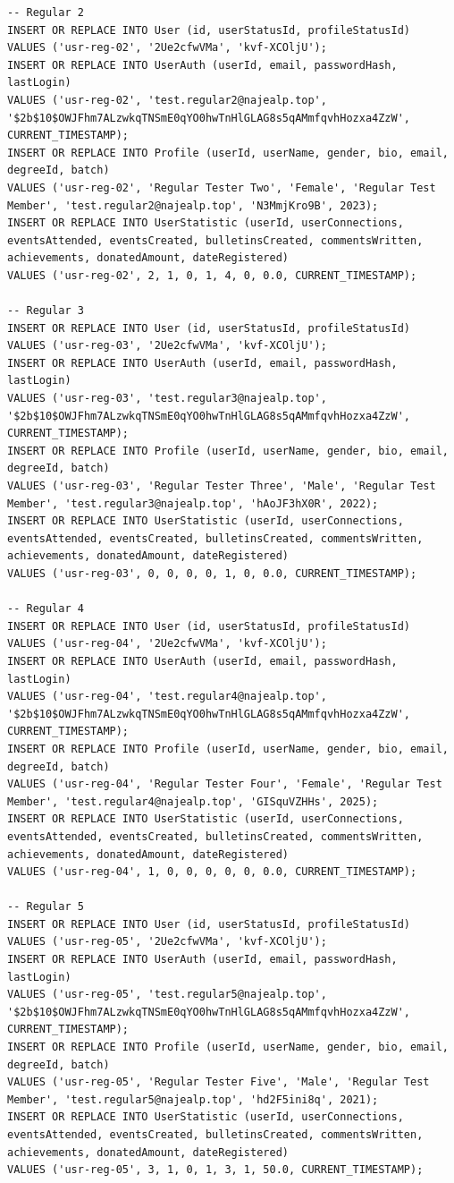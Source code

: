 \documentclass[11pt,letterpaper]{article}
\begin{document}
\begin{lstlisting}
-- Regular 2
INSERT OR REPLACE INTO User (id, userStatusId, profileStatusId)
VALUES ('usr-reg-02', '2Ue2cfwVMa', 'kvf-XCOljU');
INSERT OR REPLACE INTO UserAuth (userId, email, passwordHash, lastLogin)
VALUES ('usr-reg-02', 'test.regular2@najealp.top', '$2b$10$OWJFhm7ALzwkqTNSmE0qYO0hwTnHlGLAG8s5qAMmfqvhHozxa4ZzW', CURRENT_TIMESTAMP);
INSERT OR REPLACE INTO Profile (userId, userName, gender, bio, email, degreeId, batch)
VALUES ('usr-reg-02', 'Regular Tester Two', 'Female', 'Regular Test Member', 'test.regular2@najealp.top', 'N3MmjKro9B', 2023);
INSERT OR REPLACE INTO UserStatistic (userId, userConnections, eventsAttended, eventsCreated, bulletinsCreated, commentsWritten, achievements, donatedAmount, dateRegistered)
VALUES ('usr-reg-02', 2, 1, 0, 1, 4, 0, 0.0, CURRENT_TIMESTAMP);

-- Regular 3
INSERT OR REPLACE INTO User (id, userStatusId, profileStatusId)
VALUES ('usr-reg-03', '2Ue2cfwVMa', 'kvf-XCOljU');
INSERT OR REPLACE INTO UserAuth (userId, email, passwordHash, lastLogin)
VALUES ('usr-reg-03', 'test.regular3@najealp.top', '$2b$10$OWJFhm7ALzwkqTNSmE0qYO0hwTnHlGLAG8s5qAMmfqvhHozxa4ZzW', CURRENT_TIMESTAMP);
INSERT OR REPLACE INTO Profile (userId, userName, gender, bio, email, degreeId, batch)
VALUES ('usr-reg-03', 'Regular Tester Three', 'Male', 'Regular Test Member', 'test.regular3@najealp.top', 'hAoJF3hX0R', 2022);
INSERT OR REPLACE INTO UserStatistic (userId, userConnections, eventsAttended, eventsCreated, bulletinsCreated, commentsWritten, achievements, donatedAmount, dateRegistered)
VALUES ('usr-reg-03', 0, 0, 0, 0, 1, 0, 0.0, CURRENT_TIMESTAMP);

-- Regular 4
INSERT OR REPLACE INTO User (id, userStatusId, profileStatusId)
VALUES ('usr-reg-04', '2Ue2cfwVMa', 'kvf-XCOljU');
INSERT OR REPLACE INTO UserAuth (userId, email, passwordHash, lastLogin)
VALUES ('usr-reg-04', 'test.regular4@najealp.top', '$2b$10$OWJFhm7ALzwkqTNSmE0qYO0hwTnHlGLAG8s5qAMmfqvhHozxa4ZzW', CURRENT_TIMESTAMP);
INSERT OR REPLACE INTO Profile (userId, userName, gender, bio, email, degreeId, batch)
VALUES ('usr-reg-04', 'Regular Tester Four', 'Female', 'Regular Test Member', 'test.regular4@najealp.top', 'GISquVZHHs', 2025);
INSERT OR REPLACE INTO UserStatistic (userId, userConnections, eventsAttended, eventsCreated, bulletinsCreated, commentsWritten, achievements, donatedAmount, dateRegistered)
VALUES ('usr-reg-04', 1, 0, 0, 0, 0, 0, 0.0, CURRENT_TIMESTAMP);

-- Regular 5
INSERT OR REPLACE INTO User (id, userStatusId, profileStatusId)
VALUES ('usr-reg-05', '2Ue2cfwVMa', 'kvf-XCOljU');
INSERT OR REPLACE INTO UserAuth (userId, email, passwordHash, lastLogin)
VALUES ('usr-reg-05', 'test.regular5@najealp.top', '$2b$10$OWJFhm7ALzwkqTNSmE0qYO0hwTnHlGLAG8s5qAMmfqvhHozxa4ZzW', CURRENT_TIMESTAMP);
INSERT OR REPLACE INTO Profile (userId, userName, gender, bio, email, degreeId, batch)
VALUES ('usr-reg-05', 'Regular Tester Five', 'Male', 'Regular Test Member', 'test.regular5@najealp.top', 'hd2F5ini8q', 2021);
INSERT OR REPLACE INTO UserStatistic (userId, userConnections, eventsAttended, eventsCreated, bulletinsCreated, commentsWritten, achievements, donatedAmount, dateRegistered)
VALUES ('usr-reg-05', 3, 1, 0, 1, 3, 1, 50.0, CURRENT_TIMESTAMP);


\end{lstlisting}
\end{document}
